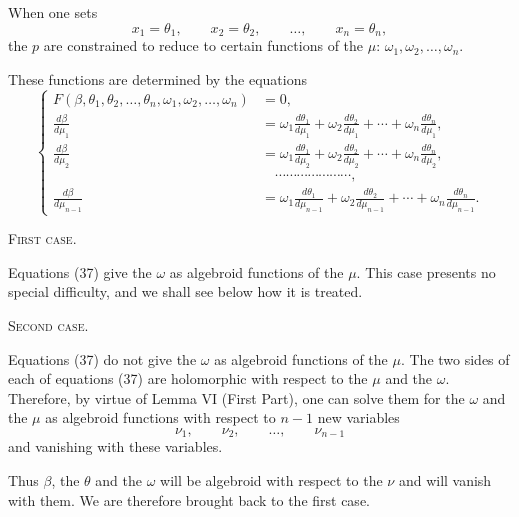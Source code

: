 \documentclass[11pt]{article}
\begin{document}
When one sets
\[
x_1=\theta_1,
\qquad
x_2=\theta_2,
\qquad \ldots,
\qquad
x_n=\theta_n,
\]
the $p$ are constrained to reduce to certain functions of the $\mu$: $\omega_1,\omega_2,\ldots,\omega_n$.

These functions are determined by the equations
\begin{equation*}\tag{37}
\left\{
\begin{aligned}
F(\beta,\theta_1,\theta_2,\ldots,\theta_n,\omega_1,\omega_2,\ldots,\omega_n)&=0,\\
\frac{d\beta}{d\mu_1}&=\omega_1\frac{d\theta_1}{d\mu_1}+\omega_2\frac{d\theta_2}{d\mu_1}+\cdots+\omega_n\frac{d\theta_n}{d\mu_1},\\
\frac{d\beta}{d\mu_2}&=\omega_1\frac{d\theta_1}{d\mu_2}+\omega_2\frac{d\theta_2}{d\mu_2}+\cdots+\omega_n\frac{d\theta_n}{d\mu_2},\\
&\hspace{1em}\cdots\cdots\cdots\cdots\cdots\cdots\cdots,\\
\frac{d\beta}{d\mu_{n-1}}&=\omega_1\frac{d\theta_1}{d\mu_{n-1}}+\omega_2\frac{d\theta_2}{d\mu_{n-1}}+\cdots+\omega_n\frac{d\theta_n}{d\mu_{n-1}}.
\end{aligned}
\right.
\end{equation*}

\begin{center}
{\scshape First case.}
\end{center}

Equations (37) give the $\omega$ as algebroid functions of the $\mu$.
This case presents no special difficulty, and we shall see below how it is treated.

\begin{center}
{\scshape Second case.}
\end{center}

Equations (37) do not give the $\omega$ as algebroid functions of the $\mu$.
The two sides of each of equations (37) are holomorphic with respect to the $\mu$ and the $\omega$. Therefore, by virtue of Lemma VI (First Part), one can solve them for the $\omega$ and the $\mu$ as algebroid functions with respect to $n-1$ new variables
\[
\nu_1,\qquad \nu_2,\qquad \ldots,\qquad \nu_{n-1}
\]
and vanishing with these variables.

Thus $\beta$, the $\theta$ and the $\omega$ will be algebroid with respect to the $\nu$ and will vanish with them. We are therefore brought back to the first case.
\end{document}

